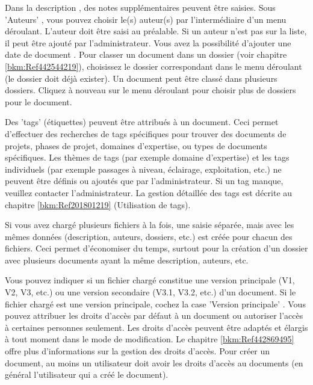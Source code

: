 
Dans la description , des notes supplémentaires peuvent être saisies. Sous 'Auteurs' , vous pouvez choisir le(s) auteur(s) par l'intermédiaire d'un menu déroulant. L'auteur doit être saisi au préalable. Si un auteur n'est pas sur la liste, il peut être ajouté par l'administrateur. Vous avez la possibilité d'ajouter une date de document . Pour classer un document dans un dossier (voir chapitre \ref{bkm:Ref442544219}), choisissez le dossier correspondant dans le menu déroulant  (le dossier doit déjà exister). Un document peut être classé dans plusieurs dossiers. Cliquez à nouveau sur le menu déroulant pour choisir plus de dossiers pour le document.

Des 'tags' (étiquettes)  peuvent être attribués à un document. Ceci permet d'effectuer des recherches de tags spécifiques pour trouver des documents de projets, phases de projet, domaines d'expertise, ou types de documents spécifiques. Les thèmes de tags (par exemple domaine d'expertise) et les tags individuels (par exemple passages à niveau, éclairage, exploitation, etc.) ne peuvent être définis ou ajoutés que par l'administrateur. Si un tag manque, veuillez contacter l'administrateur. La gestion détaillée des tags est décrite au chapitre \ref{bkm:Ref201801219} (Utilisation de tags). \newline

Si vous avez chargé plusieurs fichiers à la fois, une saisie séparée, mais avec les mêmes données (description, auteurs, dossiers, etc.) est créée pour chacun des fichiers. Ceci permet d'économiser du temps, surtout pour la création d'un dossier avec plusieurs documents ayant la même description, auteurs, etc. \newline


Vous pouvez indiquer si un fichier chargé constitue une version principale (V1, V2, V3, etc.) ou une version secondaire (V3.1, V3.2, etc.) d'un document. Si le fichier chargé est une version principale, cochez la case 'Version principale' . Vous pouvez attribuer les droits d'accès par défaut  à un document ou autoriser l'accès à certaines personnes seulement. Les droits d'accès peuvent être adaptés et élargis à tout moment dans le mode de modification. Le chapitre \ref{bkm:Ref442869495} offre plus d'informations sur la gestion des droits d'accès. Pour créer un document, au moins un utilisateur doit avoir les droits d'accès au documents (en général l'utilisateur qui a créé le document).

